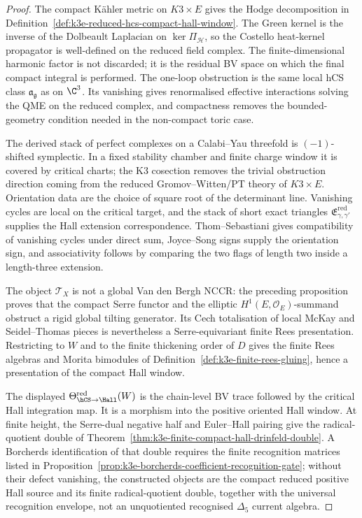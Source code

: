 \begin{proof}
The compact K\"ahler metric on \(K3\times E\) gives the Hodge
decomposition in Definition~\ref{def:k3e-reduced-hcs-compact-hall-window}.
The Green kernel is the inverse of the Dolbeault Laplacian on
\(\ker\Pi_{\mathcal H}\), so the Costello heat-kernel propagator is
well-defined on the reduced field complex.  The finite-dimensional
harmonic factor is not discarded; it is the residual BV space on which
the final compact integral is performed.  The one-loop obstruction is
the same local hCS class \(\mathfrak a_{\mathfrak g}\) as on
\(\C^3\).  Its vanishing gives renormalised effective interactions
solving the QME on the reduced complex, and compactness removes the
bounded-geometry condition needed in the non-compact toric case.

The derived stack of perfect complexes on a Calabi--Yau threefold is
\((-1)\)-shifted symplectic.  In a fixed stability chamber and finite
charge window it is covered by critical charts; the K3 cosection removes
the trivial obstruction direction coming from the reduced
Gromov--Witten/PT theory of \(K3\times E\).  Orientation data are the
choice of square root of the determinant line.  Vanishing cycles are
local on the critical target, and the stack of short exact triangles
\(\mathfrak E_{\gamma,\gamma'}^{\mathrm{red}}\) supplies the Hall
extension correspondence.  Thom--Sebastiani gives compatibility of
vanishing cycles under direct sum, Joyce--Song signs supply the
orientation sign, and associativity follows by comparing the two
flags of length two inside a length-three extension.

The object \(\mathcal T_X\) is not a global Van den Bergh NCCR: the
preceding proposition proves that the compact Serre functor and the
elliptic \(H^1(E,\mathcal O_E)\)-summand obstruct a rigid global
tilting generator.  Its Cech totalisation of local McKay and
Seidel--Thomas pieces is nevertheless a Serre-equivariant finite Rees
presentation.  Restricting to \(W\) and to the finite thickening order
of \(D\) gives the finite Rees algebras and Morita bimodules of
Definition~\ref{def:k3e-finite-rees-gluing}, hence a presentation of
the compact Hall window.

The displayed \(\Theta_{\hCS\to\Hall}^{\mathrm{red}}(W)\) is the
chain-level BV trace followed by the critical Hall integration map.
It is a morphism into the positive oriented Hall window.  At finite
height, the Serre-dual negative half and Euler--Hall pairing give the
radical-quotient double of
Theorem~\ref{thm:k3e-finite-compact-hall-drinfeld-double}.  A
Borcherds identification of that double requires the finite recognition
matrices listed in
Proposition~\ref{prop:k3e-borcherds-coefficient-recognition-gate};
without their defect vanishing, the constructed objects are the compact
reduced positive Hall source and its finite radical-quotient double,
together with the universal recognition envelope, not an unquotiented
recognised \(\Delta_5\) current algebra.
\end{proof}

